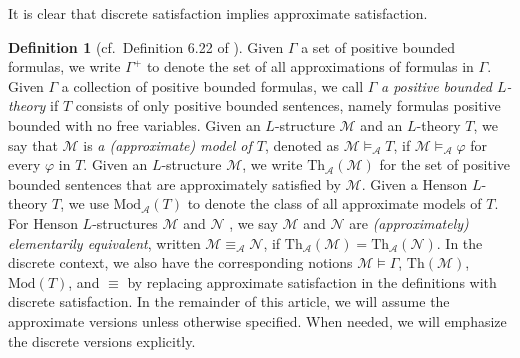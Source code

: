 \documentclass[11pt]{amsart}
\theoremstyle{definition}
\newtheorem{definition}[theorem]{Definition}
\theoremstyle{remark}
\begin{document}
It is clear that discrete  satisfaction implies approximate  satisfaction.

\begin{definition}[cf.\ Definition 6.22 of \cite{DI2017}]
Given $\Gamma$ a set of positive bounded formulas, we write $\Gamma^+$ to denote the set of all approximations of formulas in $\Gamma$. Given $\Gamma$ a collection of positive bounded formulas, we call $\Gamma$ \emph{a positive bounded $L$-theory} if $T$ consists of only positive bounded sentences, namely formulas positive bounded with no free variables. Given an $L$-structure $\mathcal{M}$ and an $L$-theory $T$, we say that $\mathcal{M}$ is \emph{a (approximate) model of $T$}, denoted as $\mathcal{M}\models_{\mathcal{A}} T$, if $\mathcal{M}\models_{\mathcal{A}} \varphi$ for every $\varphi$ in $T$. Given an $L$-structure $\mathcal{M}$, we write $\mathrm{Th}_{\mathcal{A}}(\mathcal{M})$ for the set of positive bounded sentences that are approximately satisfied by $\mathcal{M}$. Given a Henson $L$-theory $T$, we use $\mathrm{Mod}_{\mathcal{A}}(T)$ to denote the class of all approximate models of $T$. For Henson $L$-structures $\mathcal{M}$ and $\mathcal{N}$ , we say $\mathcal{M}$ and $\mathcal{N}$ are \emph{(approximately) elementarily equivalent}, written $\mathcal{M}\equiv_{\mathcal{A}}\mathcal{N}$, if $\mathrm{Th}_{\mathcal{A}}(\mathcal{M})=\mathrm{Th}_{\mathcal{A}}(\mathcal{N})$. In the discrete context, we also have the corresponding notions $\mathcal{M}\models \Gamma$, $\mathrm{Th}(\mathcal{M})$, $\mathrm{Mod}(T)$, and $\equiv$ by replacing approximate satisfaction in the definitions with discrete satisfaction. In the remainder of this article, we will assume the approximate versions unless otherwise specified. When needed, we will emphasize the discrete versions explicitly.
\end{definition}
\end{document}
